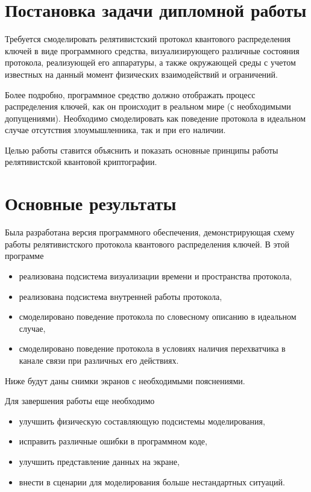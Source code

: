\section{Постановка задачи дипломной работы}
Требуется смоделировать релятивистский протокол квантового распределения ключей в виде программного средства, визуализирующего различные состояния протокола, реализующей его аппаратуры, а также окружающей среды с учетом известных на данный момент физических взаимодействий и ограничений.

Более подробно, программное средство должно отображать процесс распределения ключей, как он происходит в реальном мире (с необходимыми допущениями). Необходимо смоделировать как поведение протокола в идеальном случае отсутствия злоумышленника, так и при его наличии.

Целью работы ставится объяснить и показать основные принципы работы релятивистской квантовой криптографии.

\section{Основные результаты}
Была разработана версия программного обеспечения, демонстрирующая схему работы релятивистского протокола квантового распределения ключей. В этой программе
\begin{itemize}
    \item реализована подсистема визуализации времени и пространства протокола,
    \item реализована подсистема внутренней работы протокола,
    \item смоделировано поведение протокола по словесному описанию в идеальном случае,
    \item смоделировано поведение протокола в условиях наличия перехватчика в канале связи при различных его действиях.
  \end{itemize}
  Ниже будут даны снимки экранов с необходимыми пояснениями. 

Для завершения работы еще необходимо
\begin{itemize}
    \item улучшить физическую составляющую подсистемы моделирования,
    \item исправить различные ошибки в программном коде,
    \item улучшить представление данных на экране,
    \item внести в сценарии для моделирования больше нестандартных ситуаций.
  \end{itemize}
  
